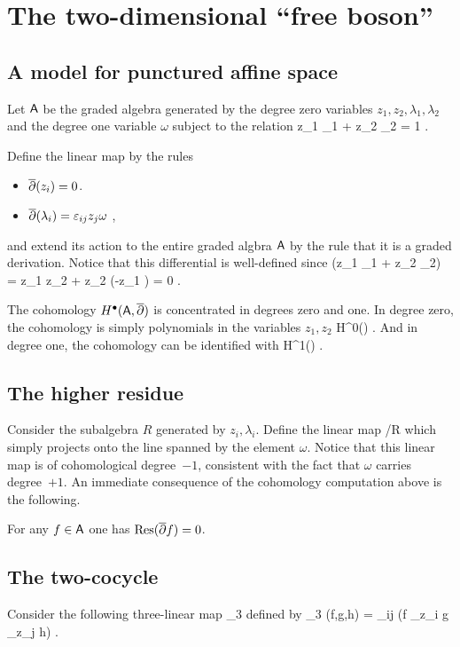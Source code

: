 \documentclass[11pt]{amsart}
\begin{document}
\section{The two-dimensional ``free boson''}

\subsection{A model for punctured affine space}

Let $\mathsf A$ be the graded algebra generated by the degree zero variables $z_1,z_2,\lambda_1,\lambda_2$ and the degree one variable $\omega$ subject to the relation
\beqn
z_1 \lambda_1 + z_2 \lambda_2 = 1 .
\eeqn

Define the linear map 
\beqn
\dbar \colon \sfA \to \sfA[1] 
\eeqn
by the rules
\begin{itemize}
	\item $\overline{\partial}(z_i) = 0$.
	\item $\overline{\partial}(\lambda_i) = \varepsilon_{ij} z_j \omega$ ,
\end{itemize}
and extend its action to the entire graded algbra $\mathsf A$ by the rule that it is a graded derivation.
Notice that this differential is well-defined since
\beqn
\dbar(z_1 \lambda_1 + z_2 \lambda_2) = z_1 z_2 \omega + z_2 (-z_1 \omega) = 0 .
\eeqn

The cohomology $H^\bullet(\mathsf A, \overline{\partial})$ is concentrated in degrees zero and one. 
In degree zero, the cohomology is simply polynomials in the variables $z_1,z_2$
\beqn
H^0(\sfA) \cong \C[z_1,z_2].
\eeqn
And in degree one, the cohomology can be identified with
\beqn
H^1(\sfA) \cong {} \omega .
\eeqn

\subsection{The higher residue}

Consider the subalgebra $R$ generated by $z_i, \lambda_i$. 
Define the linear map
\beqn
\Res \colon \sfA \to \sfA/R \cong \C[-1]
\eeqn
which simply projects onto the line spanned by the element $\omega$.
Notice that this linear map is of cohomological degree~$-1$, consistent with the fact that $\omega$ carries degree~$+1$.
An immediate consequence of the cohomology computation above is the following.
\begin{lem}\label{lem:res}
For any $f \in \mathsf A$ one has ${\rm Res}(\overline{\partial} f) = 0$.
\end{lem}

\subsection{The two-cocycle}
Consider the following three-linear map 
\beqn
\phi_3 \colon \sfA \times \sfA \times \sfA \to \C
\eeqn
defined by
\beqn
\phi_3 (f,g,h) = \ep_{ij} \Res(f \del_{z_i} g \del_{z_j} h) .
\eeqn
\end{document}
